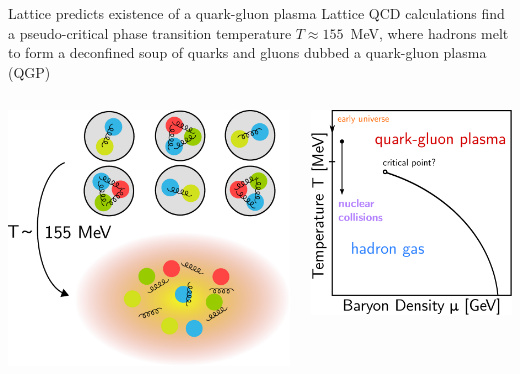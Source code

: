 \documentclass{beamer}
\begin{document}
\begin{frame}{Lattice predicts existence of a quark-gluon plasma}
  Lattice QCD calculations find a pseudo-critical phase transition temperature $T \approx 155$~MeV, where hadrons melt to form a deconfined soup of quarks and gluons dubbed a quark-gluon plasma (QGP)\\[2ex]
  \begin{columns}
    \begin{column}{0.47\textwidth}
        \includegraphics[width=\columnwidth]{confined_deconfined}
    \end{column}
    \begin{column}{0.4\textwidth}
        \includegraphics[width=\columnwidth]{phasediagram}
    \end{column}
  \end{columns}
\end{frame}
\end{document}
